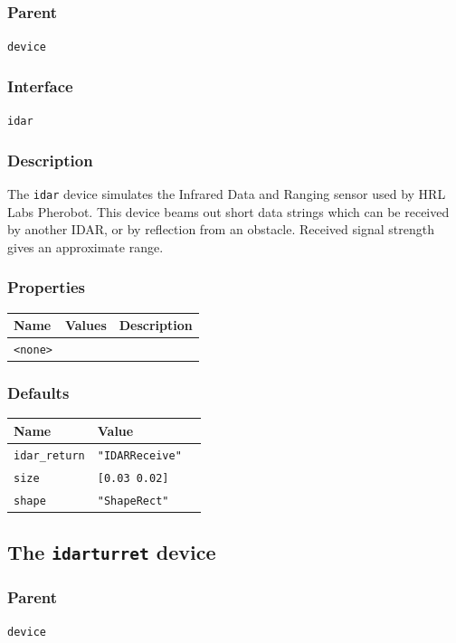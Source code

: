\documentclass[11pt,twoside]{report}
\begin{document}
\subsubsection*{Parent}
{\tt device}

\subsubsection*{Interface}
{\tt idar}

\subsubsection*{Description}
The {\tt idar} device simulates the Infrared Data and Ranging sensor
used by HRL Labs Pherobot. This device beams out short data strings
which can be received by another IDAR, or by reflection from an
obstacle. Received signal strength gives an approximate range.

\subsubsection*{Properties}
\begin{tabularx}{\columnwidth}{llX}
\hline
Name & Values & Description \\
\hline
\verb'<none>'\\
\hline
\end{tabularx}

\subsubsection*{Defaults}
\begin{tabularx}{\columnwidth}{llX}
\hline
Name & Value\\
\hline
\verb'idar_return' & \verb'"IDARReceive"'\\
\verb'size' & \verb'[0.03 0.02]'\\
\verb'shape' & \verb'"ShapeRect"'\\

\hline
\end{tabularx}

\newpage
\subsection{The {\tt idarturret} device}

\subsubsection*{Parent}
{\tt device}
\end{document}
